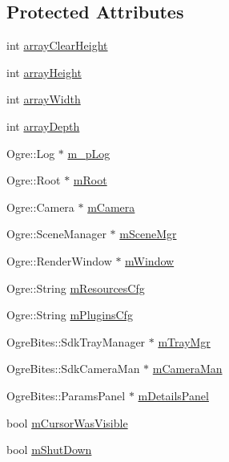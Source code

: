\subsection*{Protected Attributes}
\begin{DoxyCompactItemize}
\item 
int \hyperlink{class_base_application_a1c1a812d975a0a98781314580f84c920}{array\-Clear\-Height}
\item 
int \hyperlink{class_base_application_a6a0a6b2fd0467a5d206da0a60c68b660}{array\-Height}
\item 
int \hyperlink{class_base_application_a7d8a377aa221a84cdf095927bcb48526}{array\-Width}
\item 
int \hyperlink{class_base_application_a365f02117f2afc6bc4d54aa7569cbee5}{array\-Depth}
\item 
Ogre\-::\-Log $\ast$ \hyperlink{class_base_application_a24c535ef10e1f77e477e0adc783b2245}{m\-\_\-p\-Log}
\item 
Ogre\-::\-Root $\ast$ \hyperlink{class_base_application_add84ba707dc6c57e6283f214b1274110}{m\-Root}
\item 
Ogre\-::\-Camera $\ast$ \hyperlink{class_base_application_a3829c6b12afe911e97e6b4524b33a38b}{m\-Camera}
\item 
Ogre\-::\-Scene\-Manager $\ast$ \hyperlink{class_base_application_a8a7684f4f9a57ed3089048ad1a913b2d}{m\-Scene\-Mgr}
\item 
Ogre\-::\-Render\-Window $\ast$ \hyperlink{class_base_application_ac5d8e9c81e036897bc82f81eff8c570f}{m\-Window}
\item 
Ogre\-::\-String \hyperlink{class_base_application_a765e0df01c141a16df3178ab4f17afe6}{m\-Resources\-Cfg}
\item 
Ogre\-::\-String \hyperlink{class_base_application_a04f2fe47fa164fd78d986dc0df70b7fb}{m\-Plugins\-Cfg}
\item 
Ogre\-Bites\-::\-Sdk\-Tray\-Manager $\ast$ \hyperlink{class_base_application_a7faa397f4f4861ee8c361a01e90b4416}{m\-Tray\-Mgr}
\item 
Ogre\-Bites\-::\-Sdk\-Camera\-Man $\ast$ \hyperlink{class_base_application_a9ae38dea6316058549151fff66a91fcd}{m\-Camera\-Man}
\item 
Ogre\-Bites\-::\-Params\-Panel $\ast$ \hyperlink{class_base_application_a6a11054ca61efdf558e0ff1b2de43a12}{m\-Details\-Panel}
\item 
bool \hyperlink{class_base_application_ac7e861799862cb645f1d78b170aef80d}{m\-Cursor\-Was\-Visible}
\item 
bool \hyperlink{class_base_application_a755f26d3a9915aaf830750d877e39d86}{m\-Shut\-Down}

\end{DoxyCompactItemize}
